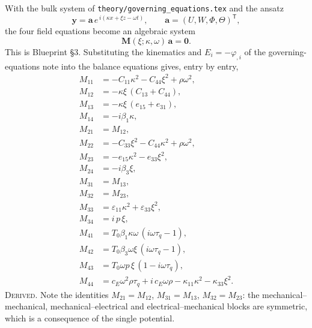 \documentclass[11pt]{article}
\newcommand{\eps}{\varepsilon}
\theoremstyle{plain}
\begin{document}
With the bulk system of \texttt{theory/governing\_equations.tex} and the ansatz
\begin{equation}
  \bm{y} = \bm{a}\,e^{\,i(\kappa x + \xi z - \omega t)},
  \qquad \bm{a} = (U,W,\Phi,\Theta)^{\mathsf T},
  \label{eq:ansatz}
\end{equation}
the four field equations become an algebraic system
\begin{equation}
  \bm{M}(\xi;\kappa,\omega)\,\bm{a} = \bm{0}.
  \label{eq:eigen}
\end{equation}
This is Blueprint \S3. Substituting the kinematics and $E_i=-\varphi_{,i}$
of the governing-equations note into the balance equations gives, entry by entry,
\begin{align}
  M_{11} &= -C_{11}\kappa^2 - C_{44}\xi^2 + \rho\omega^2, \label{eq:M11}\\
  M_{12} &= -\kappa\xi\,(C_{13}+C_{44}), \label{eq:M12}\\
  M_{13} &= -\kappa\xi\,(e_{15}+e_{31}), \label{eq:M13}\\
  M_{14} &= -i\beta_1\kappa, \label{eq:M14}\\[2pt]
  M_{21} &= M_{12}, \label{eq:M21}\\
  M_{22} &= -C_{33}\xi^2 - C_{44}\kappa^2 + \rho\omega^2, \label{eq:M22}\\
  M_{23} &= -e_{15}\kappa^2 - e_{33}\xi^2, \label{eq:M23}\\
  M_{24} &= -i\beta_3\xi, \label{eq:M24}\\[2pt]
  M_{31} &= M_{13}, \label{eq:M31}\\
  M_{32} &= M_{23}, \label{eq:M32}\\
  M_{33} &= \eps_{11}\kappa^2 + \eps_{33}\xi^2, \label{eq:M33}\\
  M_{34} &= i\,p\,\xi, \label{eq:M34}\\[2pt]
  M_{41} &= T_0\beta_1\kappa\omega\,(i\omega\tau_q - 1), \label{eq:M41}\\
  M_{42} &= T_0\beta_3\omega\xi\,(i\omega\tau_q - 1), \label{eq:M42}\\
  M_{43} &= T_0\omega p\,\xi\,(1 - i\omega\tau_q), \label{eq:M43}\\
  M_{44} &= c_E\omega^2\rho\tau_q + i\,c_E\omega\rho
            - \kappa_{11}\kappa^2 - \kappa_{33}\xi^2 . \label{eq:M44}
\end{align}
\textsc{Derived}. Note the identities $M_{21}=M_{12}$, $M_{31}=M_{13}$,
$M_{32}=M_{23}$: the mechanical--mechanical, mechanical--electrical and
electrical--mechanical blocks are symmetric, which is a consequence of the single
potential.
\end{document}
